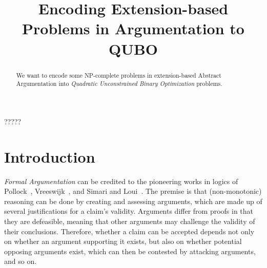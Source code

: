 \documentclass[conference]{IEEEtran}
\begin{document}
\title{Encoding Extension-based Problems in Argumentation to QUBO}

\author{
\and
{}
}

\maketitle

\begin{abstract}
We want to encode some NP-complete problems in extension-based Abstract Argumentation into \emph{Quadratic Unconstrained Binary Optimization} problems.
\end{abstract}

\begin{IEEEkeywords}
?????
\end{IEEEkeywords}

\section{Introduction}\label{sect:intro}
\emph{Formal Argumentation} can be credited to the pioneering works in logics of Pollock~\cite{pollock92}, Vreeswijk~\cite{vreeswijk92}, and Simari and Loui~\cite{simari92}. The premise is that (non-monotonic) reasoning can be done by creating and assessing arguments, which are made up of several justifications for a claim's validity. Arguments differ from proofs in that they are defeasible, meaning that other arguments may challenge the validity of their conclusions. Therefore, whether a claim can be accepted depends not only on whether an argument supporting it exists, but also on whether potential opposing arguments exist, which can then be contested by attacking arguments, and so on.
\end{document}
